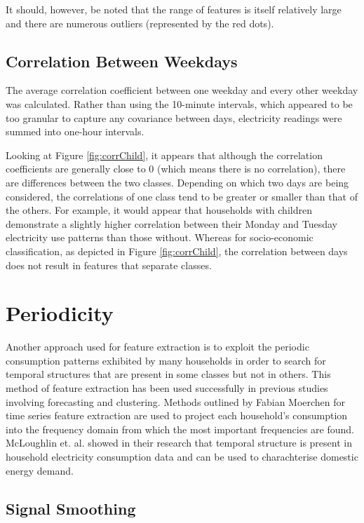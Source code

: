 It should, however, be noted that the range of features is itself relatively large and there are numerous outliers (represented by the red dots).


\subsection*{Correlation Between Weekdays}

The average correlation coefficient between one weekday and every other weekday was calculated. Rather than using the 10-minute intervals, which appeared to be too granular to capture any covariance between days, electricity readings were summed into one-hour intervals.


\corrChild %

Looking at Figure \ref{fig:corrChild}, it appears that although the correlation coefficients are generally close to 0 (which means there is no correlation), there are differences between the two classes. Depending on which two days are being considered, the correlations of one class tend to be greater or smaller than that of the others. For example, it would appear that households with children demonstrate a slightly higher correlation between their Monday and Tuesday electricity use patterns than those without. Whereas for socio-economic classification, as depicted in Figure \ref{fig:corrChild}, the correlation between days does not result in features that separate classes.

\corrSocio %


\section{Periodicity}

Another approach used for feature extraction is to exploit the periodic consumption patterns exhibited by many households in order to search for temporal structures that are present in some classes but not in others. This method of feature extraction has been used successfully in previous studies involving forecasting and clustering. Methods outlined by Fabian Moerchen \cite{Moerchen} for time series feature extraction are used to project each household's consumption into the frequency domain from which the most important frequencies are found. McLoughlin et. al. \cite{McLoughlin} showed in their research that temporal structure is present in household electricity consumption data and can be used to charachterise domestic energy demand.


\subsection*{Signal Smoothing}

